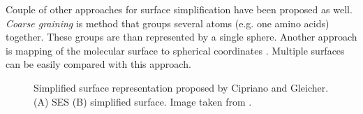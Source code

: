 Couple of other approaches for surface simplification have been proposed as well. \textit{Coarse graining} \cite{levitt1976simplified} is method that groups several atoms (e.g. one amino acids) together. These groups are than represented by a single sphere. Another approach is mapping of the molecular surface to spherical coordinates \cite{postarnakevich2009global}. Multiple surfaces can be easily compared with this approach.

\begin{figure} 
\vspace{-20pt}
  \begin{center}
  \vspace{-7pt}
  \caption{Simplified surface representation proposed by Cipriano and Gleicher. (A) SES (B) simplified surface. Image taken from \cite{cipriano2007molecular}.}
  \label{Fig:simple}  
	\end{center}
  \vspace{-30pt}
\end{figure}

